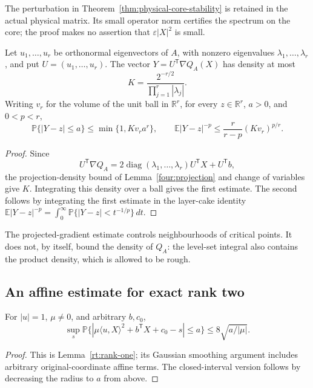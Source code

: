 The perturbation in Theorem~\ref{thm:physical-core-stability}
is retained in the actual physical matrix.  Its small operator
norm certifies the spectrum on the core; the proof makes no
assertion that \(\varepsilon|X|^2\) is small.

\begin{proposition}
\label{prop:projected-gradient}
Let \(u_1,\ldots,u_r\) be orthonormal eigenvectors of \(A\),
with nonzero eigenvalues \(\lambda_1,\ldots,\lambda_r\),
and put \(U=(u_1,\ldots,u_r)\).
The vector \(Y=U^{\mathsf T}\nabla Q_A(X)\) has density at most
\[
 K=\frac{2^{-r/2}}{\prod_{j=1}^r|\lambda_j|}.
\]
Writing \(v_r\) for the volume of the unit ball in
\(\mathbb R^r\), for every \(z\in\mathbb R^r\), \(a>0\),
and \(0<p<r\),
\[
 \mathbb P\{|Y-z|\leq a\}\leq\min\{1,Kv_ra^r\},
 \qquad
 \mathbb E|Y-z|^{-p}
 \leq\frac r{r-p}(Kv_r)^{p/r}.
\]
\end{proposition}
\begin{proof}
Since
\[
 U^{\mathsf T}\nabla Q_A
 =2\operatorname{diag}(\lambda_1,\ldots,\lambda_r)U^{\mathsf T}X
   +U^{\mathsf T}b,
\]
the projection-density bound of Lemma~\ref{four:projection}
and change of variables give \(K\).
Integrating this density over a ball gives the first estimate.
The second follows by integrating the first estimate in the
layer-cake identity
\(\mathbb E|Y-z|^{-p}
=\int_0^\infty\mathbb P\{|Y-z|<t^{-1/p}\}\,dt\).
\end{proof}

The projected-gradient estimate controls neighbourhoods of
critical points.  It does not, by itself, bound the density of
\(Q_A\): the level-set integral also contains the product
density, which is allowed to be rough.

\subsection{An affine estimate for exact rank two}

\begin{lemma}
\label{lem:rank-one-affine}
For \(|u|=1\), \(\mu\ne0\), and arbitrary \(b,c_0\),
\[
 \sup_s\mathbb P\{|\mu\langle u,X\rangle^2+
 b^{\mathsf T}X+c_0-s|\leq a\}
 \leq8\sqrt{a/|\mu|}.
\]
\end{lemma}
\begin{proof}
This is Lemma~\ref{rt:rank-one}; its Gaussian smoothing
argument includes arbitrary original-coordinate affine terms.
The closed-interval version follows by decreasing the radius
to \(a\) from above.
\end{proof}


